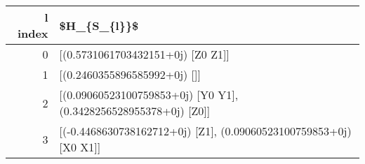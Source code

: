 \begin{tabular}{rl}
\toprule
 l index &                                                        \$H\_\{S\_\{l\}\}\$ \\
\midrule
       0 &                                  [(0.5731061703432151+0j) [Z0 Z1]] \\
       1 &                                       [(0.2460355896585992+0j) []] \\
       2 &   [(0.09060523100759853+0j) [Y0 Y1], (0.3428256528955378+0j) [Z0]] \\
       3 &  [(-0.4468630738162712+0j) [Z1], (0.09060523100759853+0j) [X0 X1]] \\
\bottomrule
\end{tabular}
